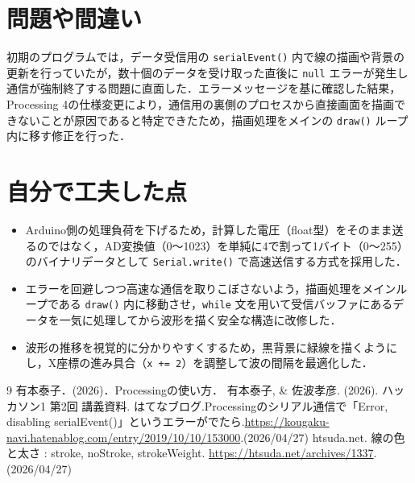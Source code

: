 \documentclass[uplatex,dvipdfmx]{jlreq}
\begin{document}
\section{問題や間違い}

初期のプログラムでは，データ受信用の \texttt{serialEvent()} 内で線の描画や背景の更新を行っていたが，数十個のデータを受け取った直後に \texttt{null} エラーが発生し通信が強制終了する問題に直面した．エラーメッセージを基に確認した結果，Processing 4の仕様変更により，通信用の裏側のプロセスから直接画面を描画できないことが原因であると特定できたため，描画処理をメインの \texttt{draw()} ループ内に移す修正を行った．

\section{自分で工夫した点}
\begin{itemize}
    \item Arduino側の処理負荷を下げるため，計算した電圧（float型）をそのまま送るのではなく，AD変換値（0〜1023）を単純に4で割って1バイト（0〜255）のバイナリデータとして \texttt{Serial.write()} で高速送信する方式を採用した．
    \item エラーを回避しつつ高速な通信を取りこぼさないよう，描画処理をメインループである \texttt{draw()} 内に移動させ，\texttt{while} 文を用いて受信バッファにあるデータを一気に処理してから波形を描く安全な構造に改修した．
    \item 波形の推移を視覚的に分かりやすくするため，黒背景に緑線を描くようにし，X座標の進み具合（\texttt{x += 2}）を調整して波の間隔を最適化した．
\end{itemize}

\begin{thebibliography}{9}
 有本泰子．(2026)．Processingの使い方．
 有本泰子, \& 佐波孝彦. (2026). ハッカソン1 第2回 講義資料.
 はてなブログ.Processingのシリアル通信で「Error, disabling serialEvent()」というエラーがでたら.\url{https://kougaku-navi.hatenablog.com/entry/2019/10/10/153000}.(2026/04/27)
 htsuda.net. 線の色と太さ : stroke, noStroke, strokeWeight. \url{https://htsuda.net/archives/1337}.(2026/04/27)
\end{thebibliography}
\end{document}

